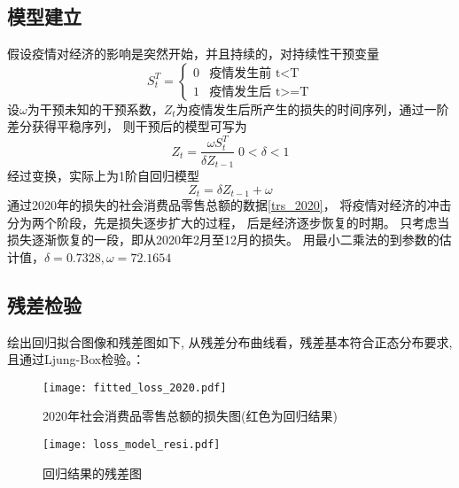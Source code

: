 \documentclass[12pt,a4paper]{nmmcm}
\begin{document}
  \subsection{模型建立}
  假设疫情对经济的影响是突然开始，并且持续的，对持续性干预变量
  \[S_t^T = \begin{cases}
    0& \text{疫情发生前 t<T}\\
    1& \text{疫情发生后 t>=T}
  \end{cases}\]
  设\(\omega\)为干预未知的干预系数，\(Z_t\)为疫情发生后所产生的损失的时间序列，通过一阶差分获得平稳序列，
  则干预后的模型可写为
  \begin{equation}
      Z_t = \frac{\omega S_t^T}{\delta Z_{t-1}} \; 0<\delta<1
  \end{equation}
  经过变换，实际上为1阶自回归模型\cite{yandou}\[Z_t = \delta Z_{t-1} + \omega\]
  通过2020年的损失的社会消费品零售总额的数据\ref{trs_2020}，
  将疫情对经济的冲击分为两个阶段，先是损失逐步扩大的过程，
  后是经济逐步恢复的时期。
  只考虑当损失逐渐恢复的一段，即从2020年2月至12月的损失。
  用最小二乘法的到参数的估计值，\(\delta =0.7328 , \omega =  72.1654 \)
  \subsection{残差检验}
  绘出回归拟合图像和残差图如下,  从残差分布曲线看，残差基本符合正态分布要求, 且通过Ljung-Box检验。：
  \begin{figure}[H] %
    \centering %
    \begin{minipage}[t]{0.48\textwidth}
      \centering
      \texttt{[image: fitted\_loss\_2020.pdf]} %
      \caption{2020年社会消费品零售总额的损失图(红色为回归结果)} %
      \label{fitted_loss_2020} %
    \end{minipage}
    \begin{minipage}[t]{0.48\textwidth}
      \centering %
      \texttt{[image: loss\_model\_resi.pdf]} %
      \caption{回归结果的残差图} %
      \label{loss_model_resi} %
    \end{minipage}
  \end{figure} 
\end{document}
